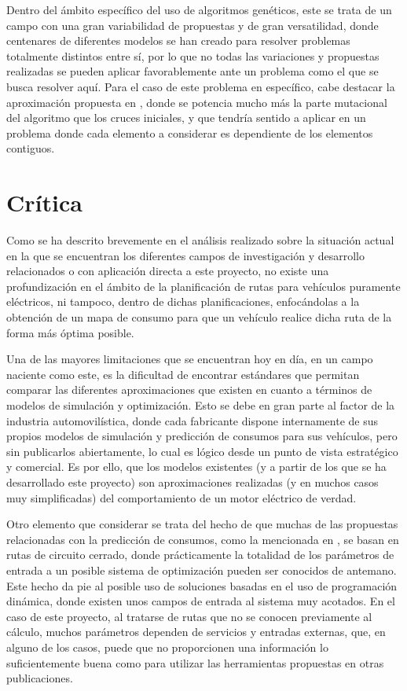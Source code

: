 \documentclass[11pt,spanish,listoffigures,listoftables]{tfgetsinf}
\begin{document}
Dentro del ámbito específico del uso de algoritmos genéticos, este se trata de un campo con una gran variabilidad de propuestas y de gran versatilidad, donde centenares de diferentes modelos se han creado para resolver problemas totalmente distintos entre sí, por lo que no todas las variaciones y propuestas realizadas se pueden aplicar favorablemente ante un problema como el que se busca resolver aquí. Para el caso de este problema en específico, cabe destacar la aproximación propuesta en \cite{DEFALCO2002285}, donde se potencia mucho más la parte mutacional del algoritmo que los cruces iniciales, y que tendría sentido a aplicar en un problema donde cada elemento a considerar es dependiente de los elementos contiguos.

\section{Crítica}
Como se ha descrito brevemente en el análisis realizado sobre la situación actual en la que se encuentran los diferentes campos de investigación y desarrollo relacionados o con aplicación directa a este proyecto, no existe una profundización en el ámbito de la planificación de rutas para vehículos puramente eléctricos, ni tampoco, dentro de dichas planificaciones, enfocándolas a la obtención de un mapa de consumo para que un vehículo realice dicha ruta de la forma más óptima posible.

Una de las mayores limitaciones que se encuentran hoy en día, en un campo naciente como este, es la dificultad de encontrar estándares que permitan comparar las diferentes aproximaciones que existen en cuanto a términos de modelos de simulación y optimización. Esto se debe en gran parte al factor de la industria automovilística, donde cada fabricante dispone internamente de sus propios modelos de simulación y predicción de consumos para sus vehículos, pero sin publicarlos abiertamente, lo cual es lógico desde un punto de vista estratégico y comercial. Es por ello, que los modelos existentes (y a partir de los que se ha desarrollado este proyecto) son aproximaciones realizadas (y en muchos casos muy simplificadas) del comportamiento de un motor eléctrico de verdad.

Otro elemento que considerar se trata del hecho de que muchas de las propuestas relacionadas con la predicción de consumos, como la mencionada en \cite{Bader13}, se basan en rutas de circuito cerrado, donde prácticamente la totalidad de los parámetros de entrada a un posible sistema de optimización pueden ser conocidos de antemano. Este hecho da pie al posible uso de soluciones basadas en el uso de programación dinámica, donde existen unos campos de entrada al sistema muy acotados. En el caso de este proyecto, al tratarse de rutas que no se conocen previamente al cálculo, muchos parámetros dependen de servicios y entradas externas, que, en alguno de los casos, puede que no proporcionen una información lo suficientemente buena como para utilizar las herramientas propuestas en otras publicaciones.
\end{document}

